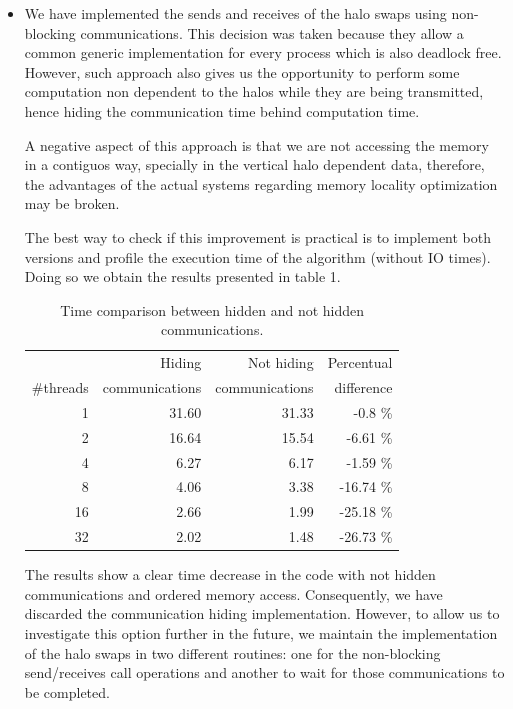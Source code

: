 \documentclass[12pt, a4paper, oneside]{article}
\begin{document}
\begin{itemize}
\item We have implemented the sends and receives of the halo swaps using non-blocking communications. This decision was taken because they allow a common generic implementation for every process which is also deadlock free.
However, such approach also gives us the opportunity to perform some computation non dependent to the halos while they are being transmitted, hence hiding the communication time behind computation time.

A negative aspect of this approach is that we are not accessing the memory in a contiguos way, specially in the vertical halo dependent data, therefore, the advantages of the actual systems regarding memory locality optimization may be broken.

The best way to check if this improvement is practical is to implement both versions and profile the execution time of the algorithm (without IO times).
Doing so we obtain the results presented in table 1.%

\begin {table}[H]
\centering
\begin{tabular}{|r|r|r|r|}
    \hline
               & Hiding & Not hiding & Percentual\\
     \#threads & communications & communications & difference\\
    \hline
    1  & 31.60 & 31.33 & -0.8 \% \\
    2  & 16.64 & 15.54 & -6.61 \% \\
    4  & 6.27 & 6.17 & -1.59 \%\\
    8  & 4.06 & 3.38 & -16.74 \% \\
    16 & 2.66 & 1.99 & -25.18 \%\\
    32 & 2.02 & 1.48 & -26.73 \%\\
    \hline
\end{tabular}
\label{table:hiding}
\caption{Time comparison between hidden and not hidden communications.}
\end{table}

The results show a clear time decrease in the code with not hidden communications and ordered memory access. Consequently, we have discarded the communication hiding implementation.
However, to allow us to investigate this option further in the future, we maintain the implementation of the halo swaps in two different routines: one for the non-blocking send/receives call operations and another to wait for those communications to be completed.

\end{itemize}
\end{document}
